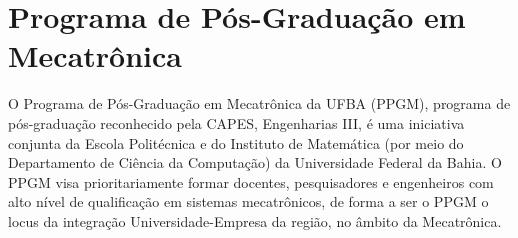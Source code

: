 \section{Programa de Pós-Graduação em Mecatrônica}     

O Programa de Pós-Graduação em Mecatrônica da UFBA (PPGM), programa de pós-graduação reconhecido pela CAPES, Engenharias III, é uma iniciativa conjunta da Escola Politécnica e do Instituto de Matemática (por meio do Departamento de Ciência da Computação) da Universidade Federal da Bahia. O PPGM visa prioritariamente formar docentes, pesquisadores e engenheiros com alto nível de qualificação em sistemas mecatrônicos, de forma a ser o PPGM o locus da integração Universidade-Empresa da região, no âmbito da Mecatrônica.


